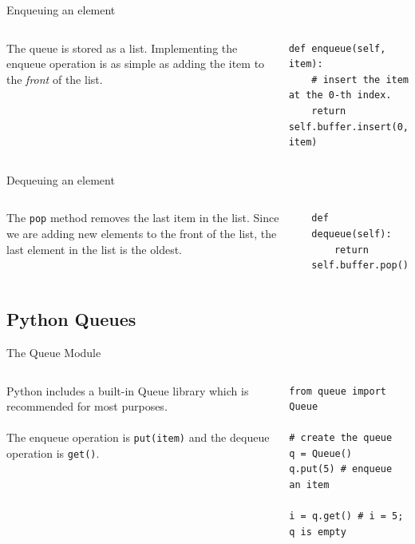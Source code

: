\documentclass{beamer}
\begin{document}
\begin{frame}[fragile]{Enqueuing an element}
\begin{columns}
    The queue is stored as a list. Implementing the enqueue operation is as simple as adding the item to the \textit{front} of the list.
    \begin{center}
    \begin{lstlisting}[language=iPython]
def enqueue(self, item):
    # insert the item at the 0-th index.
    return self.buffer.insert(0, item)\end{lstlisting}
    \end{center}
\end{columns}
\end{frame}

\begin{frame}[fragile]{Dequeuing an element}
\begin{columns}
    The \lstinline[language=iPython]{pop} method removes the last item in the list. Since we are adding new elements to the front of the list, the last element in the list is the oldest.
    \begin{center}
    \begin{lstlisting}[language=iPython]
def dequeue(self):
    return self.buffer.pop()\end{lstlisting}
    \end{center}
\end{columns}
\end{frame}

\subsection{Python Queues}
\begin{frame}[fragile]{The Queue Module}
\begin{columns}
    Python includes a built-in Queue library which is recommended for most purposes.\\~\\
    The enqueue operation is \lstinline[language=iPython]{put(item)} and the dequeue operation is \lstinline[language=iPython]{get()}.
    \begin{center}
    \begin{lstlisting}[language=iPython]
from queue import Queue

# create the queue
q = Queue()
q.put(5) # enqueue an item

i = q.get() # i = 5; q is empty \end{lstlisting}
    \end{center}
\end{columns}

\end{frame}
\end{document}
